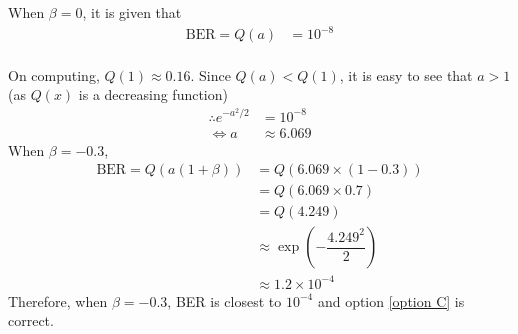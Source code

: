 \documentclass[journal,10pt,twocolumn]{IEEEtran}
\begin{document}
When $\beta = 0$, it is given that 
\begin{align}
\text{BER} = Q(a) &= 10^{-8}
\end{align}
~\\
On computing, $Q(1) \approx 0.16$. Since $Q(a)<Q(1)$, it is easy to see that $a>1$ (as $Q(x)$ is a decreasing function)
\begin{align}
\therefore e^{-a^2 / 2} &= 10^{-8}\\
\Leftrightarrow a &\approx 6.069
\end{align}
When $\beta = -0.3$,
\begin{align}
\text{BER} = Q(a(1+\beta)) &= Q(6.069 \times (1-0.3))\\
&= Q(6.069 \times 0.7)\\
&= Q(4.249)\\
&\approx \exp (-\dfrac{4.249^2}{2})\\
&\approx 1.2 \times 10^{-4}
\end{align}
Therefore, when $\beta = -0.3$, BER is closest to $10^{-4}$ and option \ref{option C} is correct.
\end{document}
